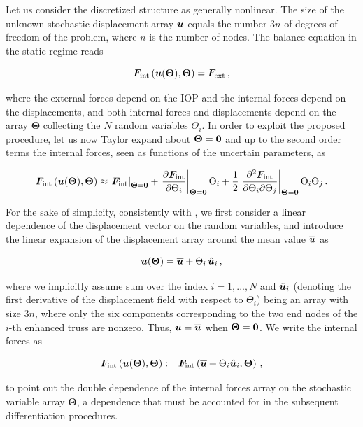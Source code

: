 \documentclass[preprint,12pt]{elsarticle}
\newcommand{\mbs}[1]{\boldsymbol{#1}}
\def \Tet {\mbs{\Theta}}
\def    \obu {{\overline{\bu}}}
\def    \hbu {{\hat{\bu}_i}}
\begin{document}
Let us consider the discretized structure as generally nonlinear. The size of the unknown stochastic displacement array $\bu$ equals the number $3n$ of degrees of freedom of the problem, where $n$ is the number of nodes. The balance equation in the static regime reads
\begin{linenomath}
\begin{equation}\label{33}
    \bF_{\rm int} \left( \bu ( \Tet ), \Tet \right) 
    = 
    \bF_{\rm ext} \, ,
\end{equation}
\end{linenomath}
where the external forces depend on the IOP and the internal forces depend on the displacements, and both internal forces and displacements depend on the array $\Tet$ collecting the $N$ random variables $\Theta_i$. In order to exploit the proposed procedure, let us now Taylor expand about $\Tet=\b0$ and up to the second order terms the internal forces, seen as functions of the uncertain parameters, as
\begin{linenomath}
\begin{equation}\label{34}
    \bF_{\rm int} \left( \bu ( \Tet ), \Tet \right)
    \approx 
    \left. \bF_{\rm int} \right|_{\Tet=\b0} 
    +
    \left. \frac{\partial \bF_{\rm int}}{\partial \Theta_i} \right|_{\Tet=\b0} 
    \Theta_i
    +
    \frac{1}{2} \left.
    \frac{\partial^2 \bF_{\rm int}}{\partial \Theta_i \partial \Theta_j} \right|_{\Tet=\b0}
    \Theta_i \Theta_j \,.
\end{equation}
\end{linenomath}

For the sake of simplicity, consistently with \cite{impollonia:2002}, we first consider a linear dependence of the displacement vector on the random variables, and introduce the linear expansion of the displacement array around the mean value $\obu$ as
\begin{linenomath}
\begin{equation}\label{35}
    \bu (\Tet) = 
    \obu + \Theta_i \, \hbu \,,
\end{equation}
\end{linenomath}
where we implicitly assume sum over the index $i=1,..., N$ and $\hbu$ (denoting the first derivative of the displacement field with respect to $\Theta_i$) being an array with size 3$n$, where only the six components corresponding to the two end nodes of the $i$-th enhanced truss are nonzero. Thus, $\bu=\obu$ when $\Tet = \b0$.
We write the internal forces as
\begin{linenomath}
\begin{equation}\label{36}
    \bF_{\rm int} \left( \bu (\Tet ), \Tet \right)
    :=
    \bF_{\rm int} \left( \obu + \Theta_i \hbu, \Tet \right)  \,,
\end{equation}
\end{linenomath}
to point out the double dependence of the internal forces array on the stochastic variable array $\Tet$, a dependence that must be accounted for in the subsequent differentiation procedures. 
\end{document}
